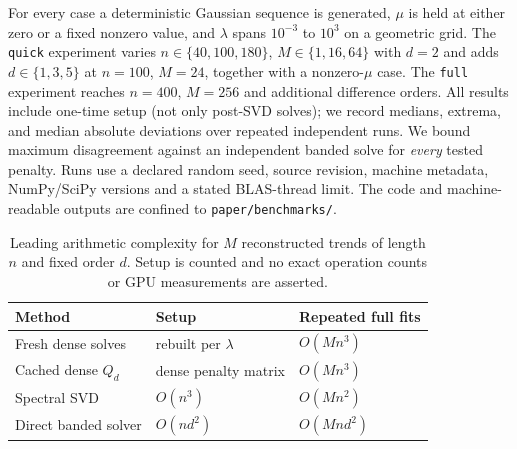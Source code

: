 For every case a deterministic Gaussian sequence is generated,
$\mu$ is held at either zero or a fixed nonzero value, and
$\lambda$ spans $10^{-3}$ to $10^3$ on a geometric grid.
The \texttt{quick} experiment varies $n\in\{40,100,180\}$,
$M\in\{1,16,64\}$ with $d=2$ and adds
$d\in\{1,3,5\}$ at $n=100$, $M=24$, together
with a nonzero-$\mu$ case. The \texttt{full} experiment reaches
$n=400$, $M=256$ and additional difference orders.
All results include one-time setup (not only post-SVD solves);
we record medians, extrema, and median absolute deviations over
repeated independent runs. We bound maximum disagreement against
an independent banded solve for \emph{every} tested penalty.
Runs use a declared random seed, source revision, machine
metadata, NumPy/SciPy versions and a stated BLAS-thread limit.
The code and machine-readable outputs are confined to
\texttt{paper/benchmarks/}.

\begin{table}[tbp]
\centering
\caption{Leading arithmetic complexity for $M$ reconstructed
trends of length $n$ and fixed order $d$. Setup is counted
and no exact operation counts or GPU measurements are asserted.}
\label{tab:complexity}
\begin{tabular}{lll}
\toprule
Method & Setup & Repeated full fits \\
\midrule
Fresh dense solves & rebuilt per $\lambda$ & $O(Mn^3)$ \\
Cached dense $Q_d$ & dense penalty matrix & $O(Mn^3)$ \\
Spectral SVD & $O(n^3)$ & $O(Mn^2)$ \\
Direct banded solver & $O(nd^2)$ & $O(Mnd^2)$ \\
\bottomrule
\end{tabular}
\end{table}

